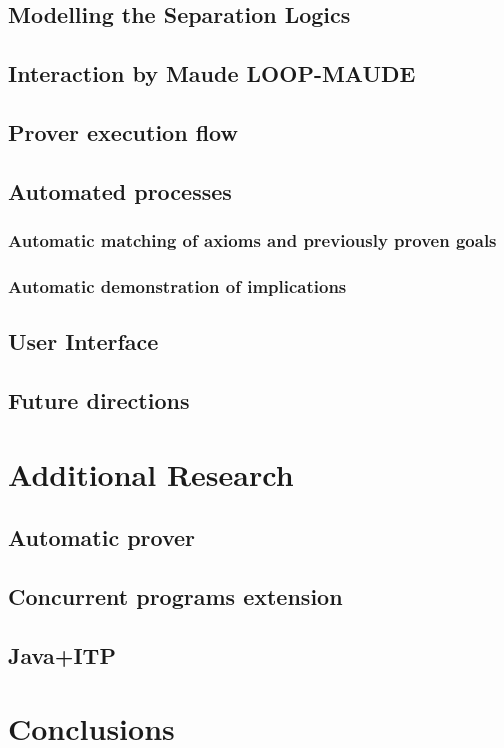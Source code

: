 \documentclass[12pt,a4paper]{article}
\begin{document}
\subsection{Modelling the Separation Logics}
\subsection{Interaction by Maude LOOP-MAUDE}
\subsection{Prover execution flow}
\subsection{Automated processes}
\subsubsection{Automatic matching of axioms and previously proven goals}
\subsubsection{Automatic demonstration of implications}
\subsection{User Interface}
\subsection{Future directions}
\section{Additional Research}
\subsection{Automatic prover}
\subsection{Concurrent programs extension}
\subsection{Java+ITP}

\section{Conclusions}
\pagebreak


\end{document}
